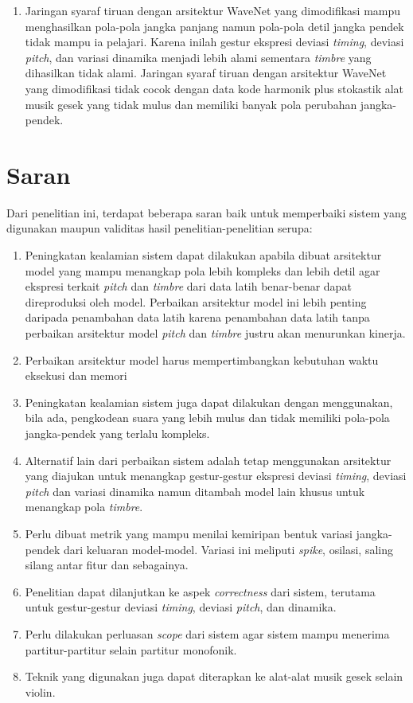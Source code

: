 \begin{enumerate}
\item Jaringan syaraf tiruan dengan arsitektur WaveNet yang dimodifikasi mampu menghasilkan pola-pola jangka panjang namun pola-pola detil jangka pendek tidak mampu ia pelajari. Karena inilah gestur ekspresi deviasi \textit{timing}, deviasi \textit{pitch}, dan variasi dinamika menjadi lebih alami sementara \textit{timbre} yang dihasilkan tidak alami. Jaringan syaraf tiruan dengan arsitektur WaveNet yang dimodifikasi tidak cocok dengan data kode harmonik plus stokastik alat musik gesek yang tidak mulus dan memiliki banyak pola perubahan jangka-pendek.

\end{enumerate}

\section{Saran}

Dari penelitian ini, terdapat beberapa saran baik untuk memperbaiki sistem yang digunakan maupun validitas hasil penelitian-penelitian serupa:
\begin{enumerate}
	\item Peningkatan kealamian sistem dapat dilakukan apabila dibuat arsitektur model yang mampu menangkap pola lebih kompleks dan lebih detil agar ekspresi terkait \textit{pitch} dan \textit{timbre} dari data latih benar-benar dapat direproduksi oleh model. Perbaikan arsitektur model ini lebih penting daripada penambahan data latih karena penambahan data latih tanpa perbaikan arsitektur model \textit{pitch} dan \textit{timbre} justru akan menurunkan kinerja.
	\item Perbaikan arsitektur model harus mempertimbangkan kebutuhan waktu eksekusi dan memori
	\item Peningkatan kealamian sistem juga dapat dilakukan dengan menggunakan, bila ada, pengkodean suara yang lebih mulus dan tidak memiliki pola-pola jangka-pendek yang terlalu kompleks.
	\item Alternatif lain dari perbaikan sistem adalah tetap menggunakan arsitektur yang diajukan untuk menangkap gestur-gestur ekspresi deviasi \textit{timing}, deviasi \textit{pitch} dan variasi dinamika namun ditambah model lain khusus untuk menangkap pola \textit{timbre}.
	\item Perlu dibuat metrik yang mampu menilai kemiripan bentuk variasi jangka-pendek dari keluaran model-model. Variasi ini meliputi \textit{spike}, osilasi, saling silang antar fitur dan sebagainya.
	\item Penelitian dapat dilanjutkan ke aspek \textit{correctness} dari sistem, terutama untuk gestur-gestur deviasi \textit{timing}, deviasi \textit{pitch}, dan dinamika.
	\item Perlu dilakukan perluasan \textit{scope} dari sistem agar sistem mampu menerima partitur-partitur selain partitur monofonik.
	\item Teknik yang digunakan juga dapat diterapkan ke alat-alat musik gesek selain violin.
\end{enumerate}